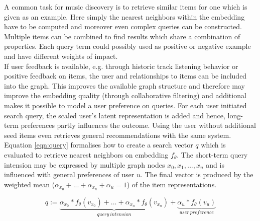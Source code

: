 \documentclass[sigconf]{acmart}
\begin{document}
A common task for music discovery is to retrieve similar items for one which is given as an example. Here simply the nearest neighbors within the embedding have to be computed and moreover even complex queries can be constructed. Multiple items can be combined to find results which share a combination of properties. Each query term could possibly used as positive or negative example and have different weights of impact. \\


If user feedback is available, e.g. through historic track listening behavior or positive feedback on items, the user and relationships to items can be included into the graph. This improves the available graph structure and therefore may improve the embedding quality (through collaborative filtering) and additional makes it possible to model a user preference on queries. For each user initiated search query, the scaled user's latent representation is added and hence, long-term preferences partly influences the outcome. Using the user without additional seed items even retrieves general recommendations with the same system. \\


Equation \ref{eqn:query} formalises how to create a search vector $ q $ which is evaluated to retrieve nearest neighbors on embedding $ f_{\theta} $. The short-term query intension may be expressed by multiple graph nodes $ x_{0}, x_{1}, ..., x_{n} $ and is influenced with general preferences of user $ u $. The final vector is produced by the weighted mean ($ \alpha_{x_{0}} + ... + \alpha_{x_{n}} + \alpha_{u} = 1 $) of the item representations.
 

\begin{equation}
\tag{1}
q := 
\underbrace{
	\alpha_{x_{0}} * f_{\theta}(v_{x_{0}}) + ... + \alpha_{x_{n}} * f_{\theta}(v_{x_{n}})
}_{query \: intension} +
\underbrace{
	\alpha_{u} * f_{\theta}(v_{u})
}_{user \: preference}
\label{eqn:query}
\end{equation}
\end{document}

